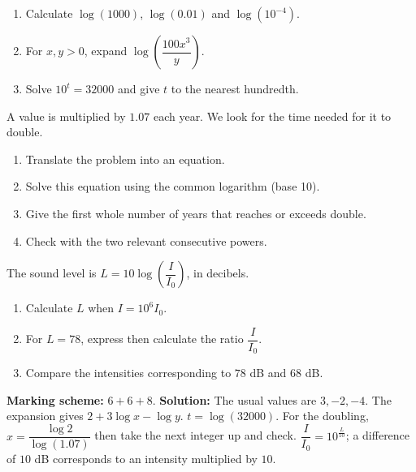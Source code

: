 \begin{exercise}
\begin{enumerate}
\item Calculate $\log(1000)$, $\log(\num{0,01})$ and $\log(10^{-4})$.
\item For $x,y>0$, expand $\log\!\left(\dfrac{100x^3}{y} \right)$.
\item Solve $10^t=32000$ and give $t$ to the nearest hundredth.
\end{enumerate}
\end{exercise}
\begin{exercise}
A value is multiplied by $\num{1,07}$ each year. We look for the time needed for it to double.
\begin{enumerate}
\item Translate the problem into an equation.
\item Solve this equation using the common logarithm (base 10).
\item Give the first whole number of years that reaches or exceeds double.
\item Check with the two relevant consecutive powers.
\end{enumerate}
\end{exercise}
\begin{exercise}
The sound level is $L=10\log\!\left(\dfrac I{I_0}\right)$, in decibels.
\begin{enumerate}
\item Calculate $L$ when $I=10^6I_0$.
\item For $L=78$, express then calculate the ratio $\dfrac I{I_0}$.
\item Compare the intensities corresponding to $78$ dB and $68$ dB.
\end{enumerate}
\end{exercise}
\begin{solution}\textbf{Marking scheme:} $6+6+8$. \textbf{Solution:} The usual values are $3,-2,-4$. The expansion gives $2+3\log x-\log y$. $t=\log(32000)$. For the doubling, $x=\dfrac{\log2}{\log(\num{1,07})}$ then take the next integer up and check. $\dfrac I{I_0}=10^{\frac L{10}}$; a difference of $10$ dB corresponds to an intensity multiplied by $10$.\end{solution}

